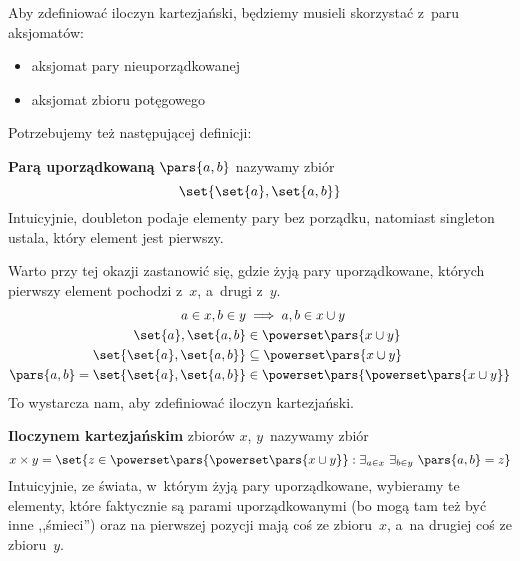 Aby zdefiniować iloczyn kartezjański, będziemy musieli skorzystać z~paru aksjomatów:
\begin{itemize}
    \item aksjomat pary nieuporządkowanej
    \item aksjomat zbioru potęgowego
\end{itemize}
Potrzebujemy też następującej definicji:
\begin{definition}
    \label{mfi:cartesian_and_relations:cartesian_definitions:def:ordered_pair}
    \textbf{Parą uporządkowaną} \(\pars{a, b}\) nazywamy zbiór
    \begin{equation*}
        \set{\set{a}, \set{a, b}}
    \end{equation*}
    Intuicyjnie, doubleton podaje elementy pary bez porządku, natomiast singleton ustala, który element jest pierwszy.
\end{definition}
Warto przy tej okazji zastanowić się, gdzie żyją pary uporządkowane, których pierwszy element pochodzi z~\(x\), a~drugi z~\(y\).
\begin{align*}
    a \in x, b \in y &\implies a, b \in x \cup y\\
    \set{a}, \set{a, b} &\in \powerset\pars{x \cup y}\\
    \set{\set{a}, \set{a, b}} &\subseteq \powerset\pars{x \cup y}\\
    \pars{a, b} = \set{\set{a}, \set{a, b}} &\in \powerset\pars{\powerset\pars{x \cup y}}
\end{align*}
To wystarcza nam, aby zdefiniować iloczyn kartezjański.
\begin{definition}
    \textbf{Iloczynem kartezjańskim} zbiorów \(x\), \(y\)~nazywamy zbiór
    \begin{equation*}
        x \times y = \set{z \in \powerset\pars{\powerset\pars{x \cup y}} : \exists_{a \in x} \ \exists_{b \in y} \ \pars{a, b} = z}
    \end{equation*}
    Intuicyjnie, ze świata, w~którym żyją pary uporządkowane, wybieramy te elementy, które faktycznie są parami uporządkowanymi (bo mogą tam też być inne ,,śmieci'') oraz na pierwszej pozycji mają coś ze zbioru~\(x\), a~na drugiej coś ze zbioru~\(y\).
\end{definition}
